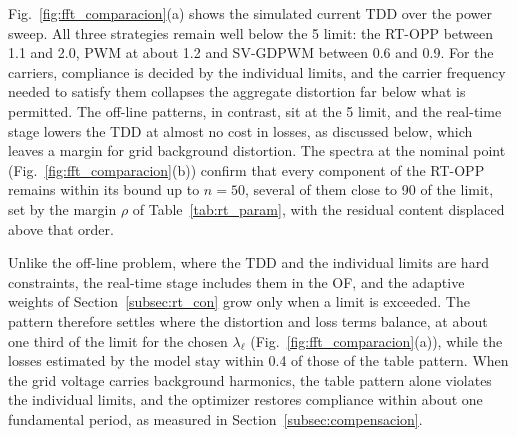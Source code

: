 \documentclass[conference]{IEEEtran}
\newcommand{\pct}{\text{\char`\%}}
\newcommand{\old}[1]{\par\smallskip\noindent{\color{gray}\footnotesize
    \textbf{[ANTES]} #1}\par\smallskip}
\renewcommand{\old}[1]{}       %
\begin{document}
Fig.~\ref{fig:fft_comparacion}(a) shows the simulated current TDD over
the power sweep. All three strategies remain well below the 5\pct{} limit: the RT-OPP
between 1.1 and 2.0\pct{}, PWM at about 1.2\pct{} and SV-GDPWM between 0.6
and 0.9\pct{}. For the carriers, compliance is decided by the individual
limits, and the carrier frequency needed to satisfy them collapses the
aggregate distortion far below what is permitted. The off-line patterns, in
contrast, sit at the 5\pct{} limit, and the real-time stage lowers the TDD
at almost no cost in losses, as discussed below, which leaves a margin for
grid background distortion. The spectra at the nominal point
(Fig.~\ref{fig:fft_comparacion}(b)) confirm that every component of the
RT-OPP remains within its bound up to $n = 50$, several of them close to
90\pct{} of the limit, set by the margin $\rho$ of
Table~\ref{tab:rt_param}, with the residual content displaced above that
order.
\old{The OPP operates exactly at the 5\pct{} limit across the whole range,
spending the entire allowance granted by the standard, while PD-PWM and
SV-GDPWM leave most of it unused, at [XX]\pct{} and [XX]\pct{}: \dots\
That unused margin is what the proposed formulation converts into the loss
reduction reported below.}
\old{\dots\ while PWM and DPWM1 leave most of it unused, at 0.25\pct{}
and 1.15\pct{}: \dots}

Unlike the off-line problem, where the TDD and the individual limits are
hard constraints, the real-time stage includes them in the OF, and the
adaptive weights of Section~\ref{subsec:rt_con} grow only when a limit is
exceeded. The pattern therefore settles where the distortion and loss terms
balance, at about one third of the limit for the chosen $\lambda_\ell$
(Fig.~\ref{fig:fft_comparacion}(a)), while the losses estimated by the
model stay within 0.4\pct{} of those of the table pattern. When the grid
voltage carries background harmonics, the table pattern alone violates the
individual limits, and the optimizer restores compliance within about one
fundamental period, as measured in Section~\ref{subsec:compensacion}.
\old{\dots\ below the limit for the chosen $\lambda_\ell$: at $M=0.87$ and
$\varphi=-15^\circ$, the TDD over the controlled harmonics converges to
1.7\pct{} \dots\ by a factor of 5.7 for a fifth harmonic of 4\pct{} and a
seventh of 3\pct{}, and the optimizer restores compliance within 13~ms
(Fig.~[X]).}
\old{In real time, the optimizer minimizes the distortion with the losses as
a secondary term, so it settles below the limit: \dots}
\end{document}

